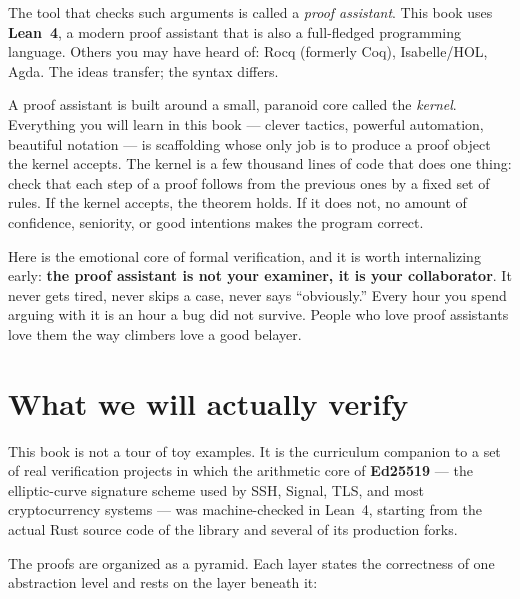 The tool that checks such arguments is called a \emph{proof assistant}. This
book uses \textbf{Lean~4}, a modern proof assistant that is also a
full-fledged programming language. Others you may have heard of: Rocq
(formerly Coq), Isabelle/HOL, Agda. The ideas transfer; the syntax differs.

A proof assistant is built around a small, paranoid core called the
\emph{kernel}. Everything you will learn in this book --- clever tactics,
powerful automation, beautiful notation --- is scaffolding whose only job is
to produce a proof object the kernel accepts. The kernel is a few thousand
lines of code that does one thing: check that each step of a proof follows
from the previous ones by a fixed set of rules. If the kernel accepts, the
theorem holds. If it does not, no amount of confidence, seniority, or good
intentions makes the program correct.

\begin{aha}
Here is the emotional core of formal verification, and it is worth
internalizing early: \textbf{the proof assistant is not your examiner, it is
your collaborator}. It never gets tired, never skips a case, never says
``obviously.'' Every hour you spend arguing with it is an hour a bug did not
survive. People who love proof assistants love them the way climbers love a
good belayer.
\end{aha}

\section{What we will actually verify}

This book is not a tour of toy examples. It is the curriculum companion to a
set of real verification projects in which the arithmetic core of
\textbf{Ed25519} --- the elliptic-curve signature scheme used by SSH, Signal,
TLS, and most cryptocurrency systems --- was machine-checked in Lean~4,
starting from the actual Rust source code of the
 library and several of its production forks.

The proofs are organized as a pyramid. Each layer states the correctness of
one abstraction level and rests on the layer beneath it:

